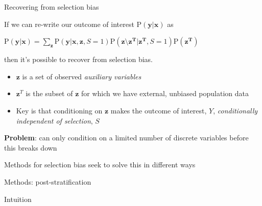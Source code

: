 \documentclass[
  ignorenonframetext,
]{beamer}
\providecommand{\tightlist}{%
  \setlength{\itemsep}{0pt}\setlength{\parskip}{0pt}}
\begin{document}
\begin{frame}{Recovering from selection bias}
\protect\hypertarget{recovering-from-selection-bias}{}

If we can re-write our outcome of interest
\(\text{P}(\mathbf{y}|\mathbf{x})\) as

\(\text{P}(\mathbf{y}|\mathbf{x}) = \sum_\mathbf{z} \text{P}(\mathbf{y}|\mathbf{x}, \mathbf{z}, S=1)\text{P}(\mathbf{z}\setminus\mathbf{z^T}|\mathbf{z^T}, S = 1)\text{P}(\mathbf{z^T})\)

then it's possible to recover from selection bias.

\begin{itemize}
\tightlist
\item
  \(\mathbf{z}\) is a set of observed \emph{auxiliary variables}
\item
  \(\mathbf{z}^T\) is the subset of \(\mathbf{z}\) for which we have
  external, unbiased population data
\item
  Key is that conditioning on \(\mathbf{z}\) makes the outcome of
  interest, \(Y\), \emph{conditionally independent of selection}, \(S\)
\end{itemize}

\textbf{Problem}: can only condition on a limited number of discrete
variables before this breaks down

Methods for selection bias seek to solve this in different ways

\end{frame}

\begin{frame}{Methods: post-stratification}
\protect\hypertarget{methods-post-stratification}{}

\begin{block}{Intuition}

\end{block}

\end{frame}
\end{document}
